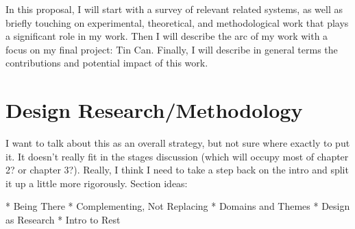 

In this proposal, I will start with a survey of relevant related systems, as well as briefly touching on experimental, theoretical, and methodological work that plays a significant role in my work. Then I will describe the arc of my  work with a focus on my final project: Tin Can. Finally, I will describe in general terms the contributions and potential impact of this work.


\section{Design Research/Methodology}

I want to talk about this as an overall strategy, but not sure where exactly to put it. It doesn't really fit in the stages discussion (which will occupy most of chapter 2? or chapter 3?). Really, I think I need to take a step back on the intro and split it up a little more rigorously. Section ideas:

 * Being There
 * Complementing, Not Replacing
 * Domains and Themes
 * Design as Research
 * Intro to Rest
